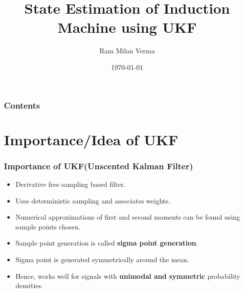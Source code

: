 \documentclass{beamer}
\title[State Estimation]{State Estimation of Induction Machine using UKF} %
\author{Ram Milan Verma} %
\institute[IITB] %
{
Indian Institute of Technology, Bombay \\ %
\medskip
\textbf{Course Project - CL 653} %
}
\date{\today} %
\begin{document}
\begin{frame}
\titlepage %
\end{frame}

\begin{frame}
\frametitle{Contents} %
\tableofcontents %
\end{frame}


\section{Importance/Idea of UKF} %


\begin{frame}
\frametitle{Importance of UKF(Unscented Kalman Filter)}
\begin{itemize}
    \item Derivative free sampling based filter.
    \item Uses deterministic sampling and associates weights.
    \item Numerical approximations of first and second moments can be found using sample points chosen.
    \item Sample point generation is called \textbf{sigma point generation}.
    \item Sigma point is generated symmetrically around the mean.
    \item Hence, works well for signals with \textbf{unimodal and symmetric} probability densities.
\end{itemize}
\end{frame}
\end{document}
